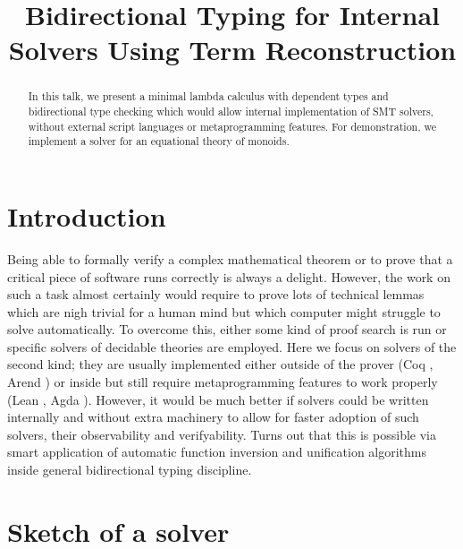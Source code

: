 \documentclass[manuscript,screen,review]{acmart}
\begin{document}
\title{Bidirectional Typing for Internal Solvers Using Term Reconstruction}

\begin{abstract}
  In this talk, we present a minimal lambda calculus with dependent types and
  bidirectional type checking which would allow internal implementation of
  SMT solvers, without external script languages or metaprogramming features.
  For demonstration, we implement a solver for an equational theory of monoids.
\end{abstract}


\maketitle

\section{Introduction}

Being able to formally verify a complex mathematical theorem or to prove that a
critical piece of software runs correctly is always a delight. However, the work
on such a task almost certainly would require to prove lots of technical lemmas
which are nigh trivial for a human mind but which computer might struggle to
solve automatically. To overcome this, either some kind of proof search is run
or specific solvers of decidable theories are employed. Here we focus on solvers
of the second kind; they are usually implemented either outside of the prover
(Coq \cite{coq}, Arend \cite{arend}) or inside but still require metaprogramming
features to work properly (Lean \cite{lean}, Agda \cite{agda}). However, it
would be much better if solvers could be written internally and without extra
machinery to allow for faster adoption of such solvers, their observability and
verifyability. Turns out that this is possible via smart application of
automatic function inversion and unification algorithms inside general
bidirectional typing discipline.

\section{Sketch of a solver}
\end{document}
